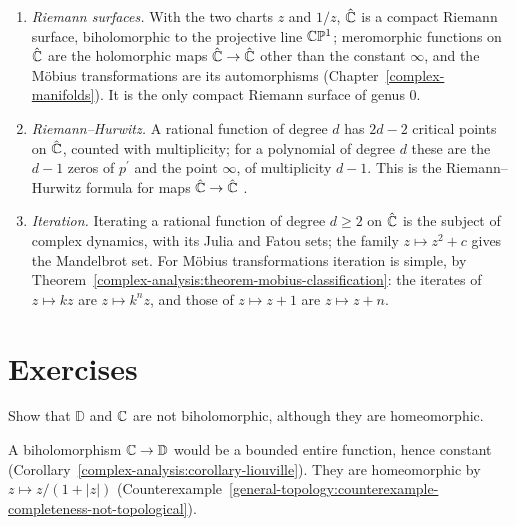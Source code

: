\begin{remark}\label{complex-analysis:remark-riemann-sphere}
\begin{enumerate}
\item \emph{Riemann surfaces.} With the two charts $z$ and $1/z$, $\hat{\mathbb{C}}$ is a compact Riemann surface, biholomorphic to the projective line $\mathbb{C}\mathbb{P}^1$; meromorphic functions on $\hat{\mathbb{C}}$ are the holomorphic maps
$\hat{\mathbb{C}} \to \hat{\mathbb{C}}$ other than the constant $\infty$, and the M\"obius transformations are its automorphisms (Chapter~\ref{complex-manifolds}). It is the only compact Riemann surface of genus $0$.
\item \emph{Riemann--Hurwitz.} A rational function of degree $d$ has $2d - 2$ critical points on $\hat{\mathbb{C}}$, counted with multiplicity; for a polynomial of degree $d$ these are the $d - 1$ zeros of $p^{\prime}$ and the point
$\infty$, of multiplicity $d - 1$. This is the Riemann--Hurwitz formula for maps $\hat{\mathbb{C}} \to \hat{\mathbb{C}}$ \cite{forster-riemann-surfaces}.
\item \emph{Iteration.} Iterating a rational function of degree $d \geq 2$ on $\hat{\mathbb{C}}$ is the subject of complex dynamics, with its Julia and Fatou sets; the family $z \mapsto z^2 + c$ gives the Mandelbrot set.
For M\"obius transformations iteration is simple, by Theorem~\ref{complex-analysis:theorem-mobius-classification}: the iterates of $z \mapsto kz$ are $z \mapsto k^nz$, and those of $z \mapsto z + 1$ are $z \mapsto z + n$.
\end{enumerate}
\end{remark}

\section{Exercises}\label{complex-analysis:section-exercises}

\begin{exercise}\label{complex-analysis:exercise-disc-not-plane}
Show that $\mathbb{D}$ and $\mathbb{C}$ are not biholomorphic, although they are homeomorphic.
\end{exercise}

\begin{solution}
A biholomorphism $\mathbb{C} \to \mathbb{D}$ would be a bounded entire function, hence constant (Corollary~\ref{complex-analysis:corollary-liouville}). They are homeomorphic by
$z \mapsto z/(1 + |z|)$ (Counterexample~\ref{general-topology:counterexample-completeness-not-topological}).
\end{solution}

